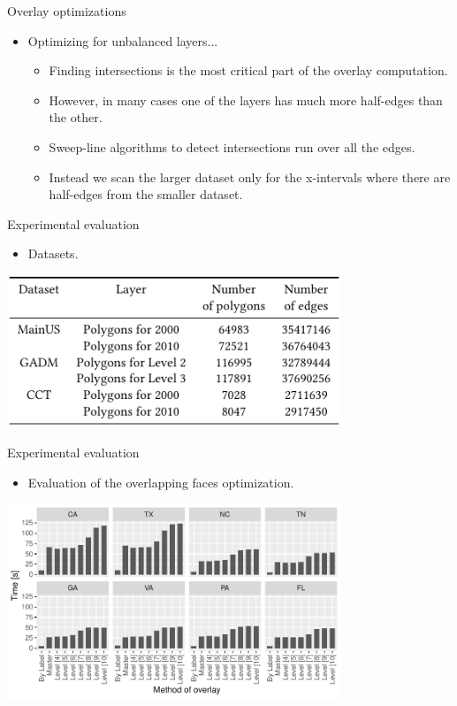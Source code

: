 \documentclass{beamer}
\begin{document}
    \begin{frame}{Overlay optimizations}
        \begin{itemize}
            \item Optimizing for unbalanced layers...
                \begin{itemize}
                    \item Finding intersections is the most critical part of the overlay computation.
                    \item However, in many cases one of the layers has much more half-edges than the other.
                    \item Sweep-line algorithms to detect intersections run over all the edges.
                    \item Instead we scan the larger dataset only for the x-intervals where there are half-edges from the smaller dataset.
                  
                \end{itemize}
        \end{itemize}
    \end{frame}
    
    \begin{frame}{Experimental evaluation}
        \begin{itemize}
            \item Datasets.
        \end{itemize}
        \vspace{1cm}
        \centering
        \includegraphics[width=0.75\textwidth]{figures/datasets}
    \end{frame}    
    
    \begin{frame}{Experimental evaluation}
        \begin{itemize}
            \item Evaluation of the overlapping faces optimization.
        \end{itemize}
        \vspace{1cm}
        \centering
        \includegraphics[width=0.75\textwidth]{figures/overlay_tester}
    \end{frame}    
\end{document}
